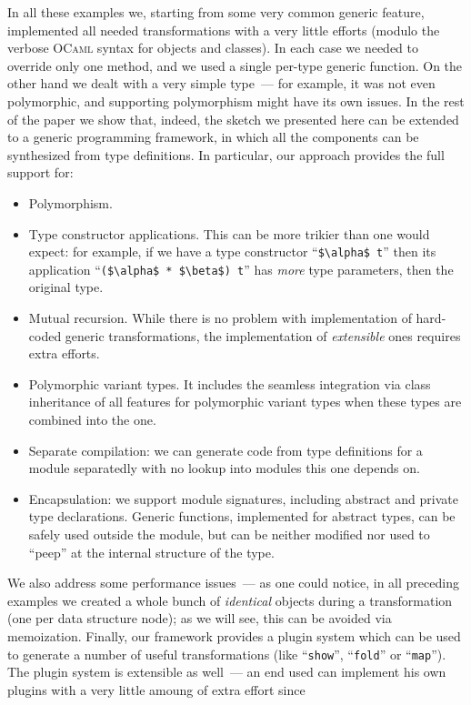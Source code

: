 In all these examples we, starting from some very common generic feature, implemented all needed transformations with a very little efforts (modulo
the verbose \textsc{OCaml} syntax for objects and classes). In each case we needed to override only one method, and we used a single per-type generic
function. On the other hand we dealt with a very simple type~--- for example, it was not even polymorphic, and supporting polymorphism might have
its own issues. In the rest of the paper we show that, indeed, the sketch we presented here can be extended to a generic programming
framework, in which all the components can be synthesized from type definitions. In particular, our approach provides the full support for:

\begin{itemize}
\item Polymorphism.
\item Type constructor applications. This can be more trikier than one would expect: for example, if
  we have a type constructor ``\lstinline{$\alpha$ t}'' then its application ``\lstinline{($\alpha$ * $\beta$) t}'' has
  \emph{more} type parameters, then the original type.
\item Mutual recursion. While there is no problem with implementation of hard-coded generic transformations, the implementation of \emph{extensible} ones
  requires extra efforts.
\item Polymorphic variant types. It includes the seamless integration via class inheritance of all features
  for polymorphic variant types when these types are combined into the one.
\item Separate compilation: we can generate code from type definitions for a module separatedly with no lookup into
  modules this one depends on.
\item Encapsulation: we support module signatures, including abstract and private type declarations. Generic functions, implemented for
  abstract types, can be safely used outside the module, but can be neither modified nor used to ``peep'' at the internal structure of
  the type.  
\end{itemize}

We also address some performance issues~--- as one could notice, in all preceding examples we created a whole bunch of \emph{identical} objects during a
transformation (one per data structure node); as we will see, this can be avoided via memoization. Finally, our framework provides a plugin system which can be
used to generate a number of useful transformations (like ``\lstinline{show}'', ``\lstinline{fold}'' or ``\lstinline{map}''). The plugin system is
extensible as well~--- an end used can implement his own plugins with a very little amoung of extra effort since 
